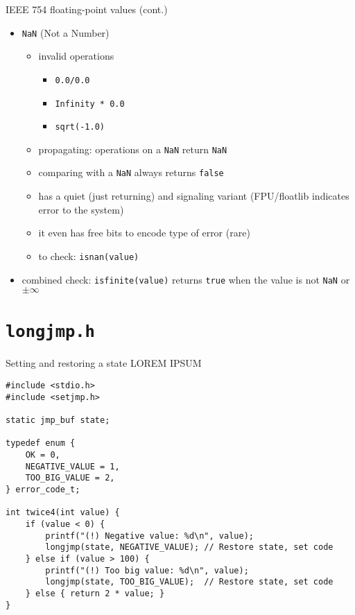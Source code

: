 \documentclass[aspectratio=169,14pt]{beamer}
\begin{document}
\begin{frame}{IEEE 754 floating-point values (cont.)}
\begin{itemize}
    \item \texttt{NaN} (Not a Number)
    \begin{itemize}
        \item invalid operations
        \begin{itemize}
            \item \texttt{0.0/0.0}
            \item \texttt{Infinity * 0.0}
            \item \texttt{sqrt(-1.0)}
        \end{itemize}
        \item propagating: operations on a \texttt{NaN} return \texttt{NaN}
        \item comparing with a \texttt{NaN} always returns \texttt{false}
        \item has a quiet (just returning) and signaling variant (FPU/floatlib indicates error to the system)
        \item it even has free bits to encode type of error (rare)
        \item to check: \texttt{isnan(value)}
    \end{itemize}
    \item combined check: \texttt{isfinite(value)} returns \texttt{true} when the value is not \texttt{NaN} or \( \pm \infty \)
\end{itemize}
\end{frame}



\section{\texttt{longjmp.h}}
\begin{frame}{Setting and restoring a state}
LOREM IPSUM
\end{frame}

\begin{frame}[fragile]{}
\begin{lstlisting}[style=cstyle]
#include <stdio.h>
#include <setjmp.h>

static jmp_buf state;

typedef enum {
    OK = 0,
    NEGATIVE_VALUE = 1,
    TOO_BIG_VALUE = 2,
} error_code_t;

int twice4(int value) {
    if (value < 0) {
        printf("(!) Negative value: %d\n", value);
        longjmp(state, NEGATIVE_VALUE); // Restore state, set code
    } else if (value > 100) {
        printf("(!) Too big value: %d\n", value);
        longjmp(state, TOO_BIG_VALUE);  // Restore state, set code
    } else { return 2 * value; }
}
\end{lstlisting}
\end{frame}
\end{document}
